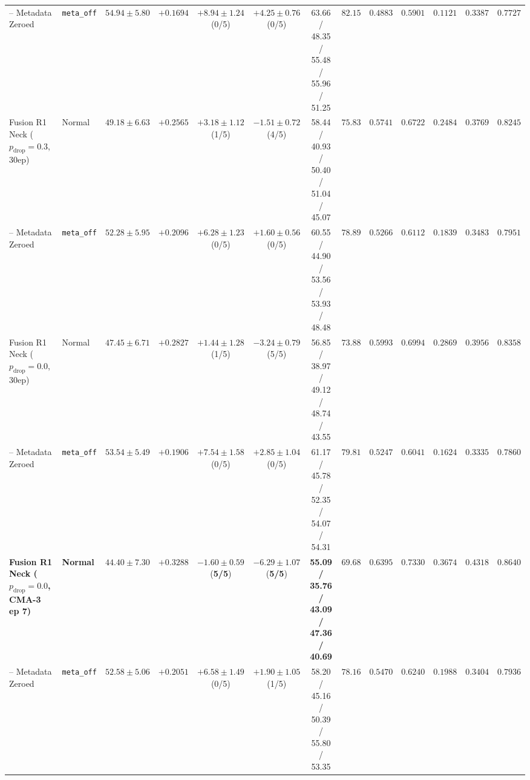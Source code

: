 \documentclass[conference]{IEEEtran}
\begin{document}
\begin{table}[t]
{\begin{tabular}{llccccccccccc}
      \quad -- Metadata Zeroed                                      & \texttt{meta\_off} &     $54.94 \pm 5.80$      &     $+0.1694$      &          $+8.94 \pm 1.24$ (0/5)          &          $+4.25 \pm 0.76$ (0/5)          &     63.66 / 48.35 / 55.48 / 55.96 / 51.25      &     $82.15$      &     $0.4883$      &     $0.5901$      &      $0.1121$      &     $0.3387$      &             $0.7727$             \\
      Fusion R1 Neck ($p_{\text{drop}} = 0.3$, 30ep)                & Normal             &     $49.18 \pm 6.63$      &     $+0.2565$      &          $+3.18 \pm 1.12$ (1/5)          &          $-1.51 \pm 0.72$ (4/5)          &     58.44 / 40.93 / 50.40 / 51.04 / 45.07      &     $75.83$      &     $0.5741$      &     $0.6722$      &      $0.2484$      &     $0.3769$      &             $0.8245$             \\
      \quad -- Metadata Zeroed                                      & \texttt{meta\_off} &     $52.28 \pm 5.95$      &     $+0.2096$      &          $+6.28 \pm 1.23$ (0/5)          &          $+1.60 \pm 0.56$ (0/5)          &     60.55 / 44.90 / 53.56 / 53.93 / 48.48      &     $78.89$      &     $0.5266$      &     $0.6112$      &      $0.1839$      &     $0.3483$      &             $0.7951$             \\
      Fusion R1 Neck ($p_{\text{drop}} = 0.0$, 30ep)                & Normal             &     $47.45 \pm 6.71$      &     $+0.2827$      &          $+1.44 \pm 1.28$ (1/5)          &          $-3.24 \pm 0.79$ (5/5)          &     56.85 / 38.97 / 49.12 / 48.74 / 43.55      &     $73.88$      &     $0.5993$      &     $0.6994$      &      $0.2869$      &     $0.3956$      &             $0.8358$             \\
      \quad -- Metadata Zeroed                                      & \texttt{meta\_off} &     $53.54 \pm 5.49$      &     $+0.1906$      &          $+7.54 \pm 1.58$ (0/5)          &          $+2.85 \pm 1.04$ (0/5)          &     61.17 / 45.78 / 52.35 / 54.07 / 54.31      &     $79.81$      &     $0.5247$      &     $0.6041$      &      $0.1624$      &     $0.3335$      &             $0.7860$             \\
      \midrule
      \textbf{Fusion R1 Neck ($p_{\text{drop}} = 0.0$, CMA-3 ep 7)} & \textbf{Normal}    & $\mathbf{44.40 \pm 7.30}$ & $\mathbf{+0.3288}$ & $\mathbf{-1.60 \pm 0.59}$ (\textbf{5/5}) & $\mathbf{-6.29 \pm 1.07}$ (\textbf{5/5}) & \textbf{55.09 / 35.76 / 43.09 / 47.36 / 40.69} & $\mathbf{69.68}$ & $\mathbf{0.6395}$ & $\mathbf{0.7330}$ & $\mathbf{0.3674}$  & $\mathbf{0.4318}$ &        $\mathbf{0.8640}$         \\
      \quad -- Metadata Zeroed                                      & \texttt{meta\_off} &     $52.58 \pm 5.06$      &     $+0.2051$      &          $+6.58 \pm 1.49$ (0/5)          &          $+1.90 \pm 1.05$ (1/5)          &     58.20 / 45.16 / 50.39 / 55.80 / 53.35      &     $78.16$      &     $0.5470$      &     $0.6240$      &      $0.1988$      &     $0.3404$      &             $0.7936$             \\
      \bottomrule
    \end{tabular}%
  }
\end{table}
\end{document}
